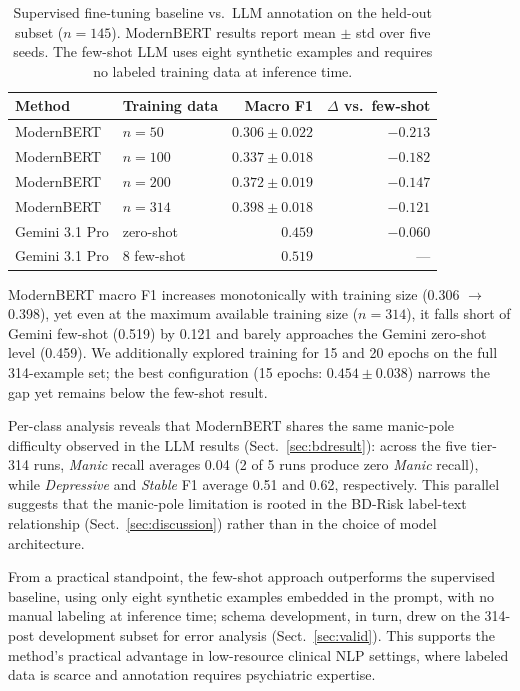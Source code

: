 \documentclass[runningheads]{llncs}
\begin{document}
\begin{table}[t]
\caption{Supervised fine-tuning baseline vs.~LLM annotation on the held-out subset ($n = 145$). ModernBERT results report mean $\pm$ std over five seeds. The few-shot LLM uses eight synthetic examples and requires no labeled training data at inference time.}
\label{tab:bert-baseline}
\centering
\setlength{\tabcolsep}{7pt}
\begin{tabular}{llrr}
\toprule
\textbf{Method} & \textbf{Training data} & \textbf{Macro F1} & \textbf{$\Delta$ vs.~few-shot} \\
\midrule
ModernBERT & $n = 50$ & $0.306 \pm 0.022$ & $-0.213$ \\
ModernBERT & $n = 100$ & $0.337 \pm 0.018$ & $-0.182$ \\
ModernBERT & $n = 200$ & $0.372 \pm 0.019$ & $-0.147$ \\
ModernBERT & $n = 314$ & $0.398 \pm 0.018$ & $-0.121$ \\
\midrule
Gemini 3.1 Pro & zero-shot & $0.459$ & $-0.060$ \\
Gemini 3.1 Pro & 8 few-shot & $\mathbf{0.519}$ & --- \\
\bottomrule
\end{tabular}
\end{table}

ModernBERT macro F1 increases monotonically with training size (0.306 $\rightarrow$ 0.398), yet even at the maximum available training size ($n = 314$), it falls short of Gemini few-shot (0.519) by 0.121 and barely approaches the Gemini zero-shot level (0.459). We additionally explored training for 15 and 20 epochs on the full 314-example set; the best configuration (15 epochs: $0.454 \pm 0.038$) narrows the gap yet remains below the few-shot result.

Per-class analysis reveals that ModernBERT shares the same manic-pole difficulty observed in the LLM results (Sect.~\ref{sec:bdresult}): across the five tier-314 runs, \emph{Manic} recall averages 0.04 (2 of 5 runs produce zero \emph{Manic} recall), while \emph{Depressive} and \emph{Stable} F1 average 0.51 and 0.62, respectively. This parallel suggests that the manic-pole limitation is rooted in the BD-Risk label-text relationship (Sect.~\ref{sec:discussion}) rather than in the choice of model architecture.

 From a practical standpoint, the few-shot approach outperforms the supervised baseline, using only eight synthetic examples embedded in the prompt, with no manual labeling at inference time; schema development, in turn, drew on the 314-post development subset for error analysis (Sect.~\ref{sec:valid}). This supports the method's practical advantage in low-resource clinical NLP settings, where labeled data is scarce and annotation requires psychiatric expertise.
\end{document}
